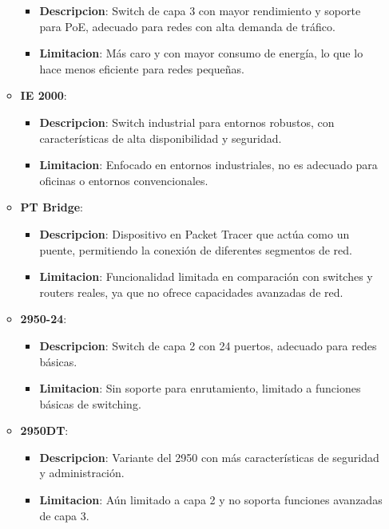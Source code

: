\documentclass{article}
\begin{document}
\begin{enumerate}
\begin{itemize}
                \begin{itemize}
                    \item \textbf{Descripcion}: Switch de capa 3 con mayor rendimiento y soporte para PoE, adecuado para redes con alta demanda de tráfico.
                    \item \textbf{Limitacion}:  Más caro y con mayor consumo de energía, lo que lo hace menos eficiente para redes pequeñas.
                \end{itemize}
                \item \textbf{IE 2000}:
                \begin{itemize}
                    \item \textbf{Descripcion}: Switch industrial para entornos robustos, con características de alta disponibilidad y seguridad.
                    \item \textbf{Limitacion}: Enfocado en entornos industriales, no es adecuado para oficinas o entornos convencionales.
                \end{itemize}
             \item \textbf{PT Bridge}:
                \begin{itemize}
                    \item \textbf{Descripcion}:  Dispositivo en Packet Tracer que actúa como un puente, permitiendo la conexión de diferentes segmentos de red.
                    \item \textbf{Limitacion}: Funcionalidad limitada en comparación con switches y routers reales, ya que no ofrece capacidades avanzadas de red.
                \end{itemize}
                \item \textbf{2950-24}:
                \begin{itemize}
                    \item \textbf{Descripcion}: Switch de capa 2 con 24 puertos, adecuado para redes básicas.
                    \item \textbf{Limitacion}: Sin soporte para enrutamiento, limitado a funciones básicas de switching.
                \end{itemize}
                \item \textbf{2950DT}:
                \begin{itemize}
                    \item \textbf{Descripcion}: Variante del 2950 con más características de seguridad y administración.
                    \item \textbf{Limitacion}: Aún limitado a capa 2 y no soporta funciones avanzadas de capa 3.

\end{itemize}
\end{itemize}
\end{enumerate}
\end{document}
